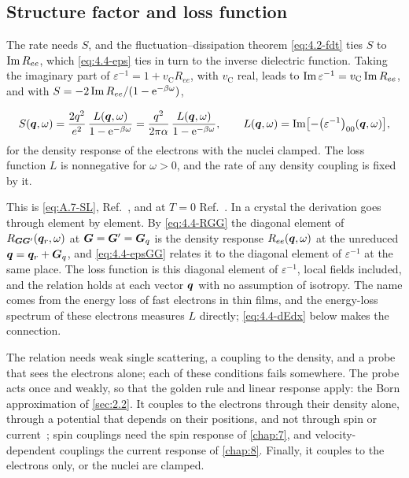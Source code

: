 \subsection{Structure factor and loss function}

The rate needs $S$, and the fluctuation--dissipation theorem \cref{eq:4.2-fdt} ties $S$ to $\operatorname{Im} R_{ee}$, which \cref{eq:4.4-eps} ties in turn to the inverse dielectric function. Taking the imaginary part of $\varepsilon^{-1} = 1 + v_{\mathrm{C}}R_{ee}$, with $v_{\mathrm{C}}$ real, leads to $\operatorname{Im}\varepsilon^{-1} = v_{\mathrm{C}}\operatorname{Im} R_{ee}$, and with $S = -2\operatorname{Im} R_{ee}/(1 - \mathrm{e}^{-\beta\omega})$,
\begin{keyresult}
\begin{equation}
  S(\bm{q},\omega) = \frac{2q^2}{e^2}\,\frac{L(\bm{q},\omega)}{1 - \mathrm{e}^{-\beta\omega}} = \frac{q^2}{2\pi\alpha}\,\frac{L(\bm{q},\omega)}{1 - \mathrm{e}^{-\beta\omega}}, \qquad
  L(\bm{q},\omega) = \operatorname{Im}\bigl[-\bigl(\varepsilon^{-1}\bigr)_{00}(\bm{q},\omega)\bigr] ,
  \label{eq:4.4-SL}
\end{equation}
for the density response of the electrons with the nuclei clamped. The loss function $L$ is nonnegative for $\omega > 0$, and the rate of any density coupling is fixed by it.
\end{keyresult}
This is \cref{eq:A.7-SL}, Ref.~\cite[Eq.~(6)]{knapen2021dark}, and at $T = 0$ Ref.~\cite[Eqs.~(S.7) and (S.24)]{hochberg2021determining}. In a crystal the derivation goes through element by element. By \cref{eq:4.4-RGG} the diagonal element of $R_{\bm{G}\bm{G}'}(\bm{q}_r,\omega)$ at $\bm{G} = \bm{G}' = \bm{G}_q$ is the density response $R_{ee}(\bm{q},\omega)$ at the unreduced $\bm{q} = \bm{q}_r + \bm{G}_q$, and \cref{eq:4.4-epsGG} relates it to the diagonal element of $\varepsilon^{-1}$ at the same place. The loss function is this diagonal element of $\varepsilon^{-1}$, local fields included, and the relation holds at each vector $\bm{q}$ with no assumption of isotropy. The name comes from the energy loss of fast electrons in thin films, and the energy-loss spectrum of these electrons measures $L$ directly; \cref{eq:4.4-dEdx} below makes the connection.

The relation needs weak single scattering, a coupling to the density, and a probe that sees the electrons alone; each of these conditions fails somewhere. The probe acts once and weakly, so that the golden rule and linear response apply: the Born approximation of \cref{sec:2.2}. It couples to the electrons through their density alone, through a potential that depends on their positions, and not through spin or current~\cite{hochberg2021determining}; spin couplings need the spin response of \cref{chap:7}, and velocity-dependent couplings the current response of \cref{chap:8}. Finally, it couples to the electrons only, or the nuclei are clamped.

